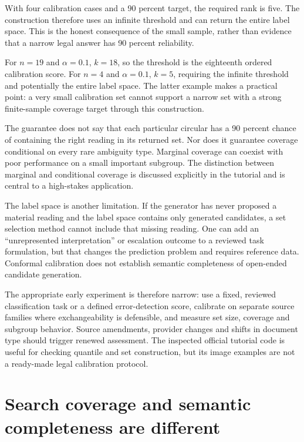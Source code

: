 \documentclass[12pt,a4paper,oneside,openany]{book}
\begin{document}
With four calibration cases and a 90 percent target, the required rank is five. The construction therefore uses an infinite threshold and can return the entire label space. This is the honest consequence of the small sample, rather than evidence that a narrow legal answer has 90 percent reliability.


For $n=19$ and $\alpha=0.1$, $k=18$, so the threshold is the eighteenth ordered
calibration score. For $n=4$ and $\alpha=0.1$, $k=5$, requiring the infinite
threshold and potentially the entire label space. The latter example makes a
practical point: a very small calibration set cannot support a narrow set with a
strong finite-sample coverage target through this construction.

The guarantee does not say that each particular circular has a 90 percent chance
of containing the right reading in its returned set. Nor does it guarantee
coverage conditional on every rare ambiguity type. Marginal coverage can coexist
with poor performance on a small important subgroup. The distinction between
marginal and conditional coverage is discussed explicitly in the tutorial
\citep[section 3]{conformal2022} and is central to a high-stakes application.

The label space is another limitation. If the generator has never proposed a
material reading and the label space contains only generated candidates, a set
selection method cannot include that missing reading. One can add an
``unrepresented interpretation'' or escalation outcome to a reviewed task
formulation, but that changes the prediction problem and requires reference data.
Conformal calibration does not establish semantic completeness of open-ended
candidate generation.

The appropriate early experiment is therefore narrow: use a fixed, reviewed
classification task or a defined error-detection score, calibrate on separate
source families where exchangeability is defensible, and measure set size,
coverage and subgroup behavior. Source amendments, provider changes and shifts in
document type should trigger renewed assessment. The inspected official tutorial
code is useful for checking quantile and set construction, but its image examples
are not a ready-made legal calibration protocol.

\section{Search coverage and semantic completeness are different}
\label{merge:M09:10}
\end{document}

